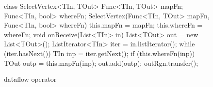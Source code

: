 \begin{figure}[t!]
\begin{numcodejava}
class SelectVertex<TIn, TOut> {
  Func<TIn, TOut> mapFn;
  Func<TIn, bool> whereFn;
  SelectVertex(Func<TIn, TOut> mapFn,
               Func<TIn, bool> whereFn) {
    this.mapFn = mapFn;
    this.whereFn = whereFn;
  }
  void onReceive(List<TIn> in) {
    List<TOut> out = new List<TOut>();
    ListIterator<TIn> iter = in.listIterator();
    while (iter.hasNext()) {
       TIn inp = iter.getNext();
       if (this.whereFn(inp))  {
          TOut outp = this.mapFn(inp);
          out.add(outp);
       }
    }
  }
  outRgn.transfer();
}
\end{numcodejava}
\caption{ dataflow operator}
\label{fig:motivating-eg}
\end{figure}
